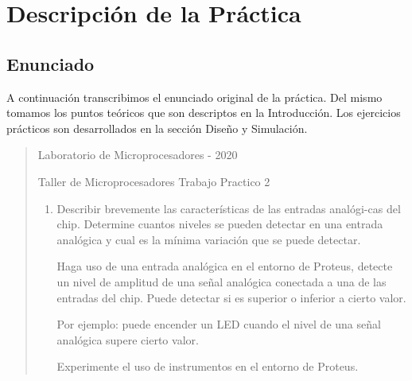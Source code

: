 \documentclass[a4paper]{article}
\begin{document}
\section{Descripción de la Práctica}

\subsection{Enunciado}

A continuación transcribimos el enunciado original de la práctica.
Del mismo tomamos los puntos teóricos que son descriptos en la 
Introducción. Los ejercicios prácticos son desarrollados en la sección
Diseño y Simulación.

\begin{quotation}

    \begin{center}

        Laboratorio de Microprocesadores - 2020
        
        Taller de Microprocesadores Trabajo Practico  2                

    \end{center}

    \begin{enumerate}

        \item{
            Describir brevemente las características de las entradas 
            analógi-cas del chip. Determine cuantos niveles se pueden 
            detectar en una entrada analógica y cual es la mínima 
            variación que se puede detectar.
            
            Haga uso de una entrada analógica en el entorno de Proteus,
            detecte un nivel de amplitud de una señal analógica 
            conectada a una de las entradas del chip. Puede detectar 
            si es superior o inferior a cierto valor.
            
            Por ejemplo: puede encender un LED cuando el nivel de una 
            señal analógica supere cierto valor.

            Experimente el uso de instrumentos en el entorno de Proteus.

}
\end{enumerate}
\end{quotation}
\end{document}
